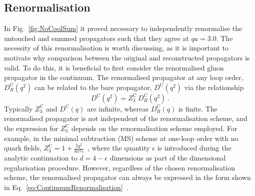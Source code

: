 \subsection{Renormalisation}\label{sec:Renormalisation}

In Fig.~\ref{fig:NoCoolSum} it proved necessary to independently renormalise the untouched and summed propagators such that they agree at $qa=3.0$. The necessity of this renormalisation is worth discussing, as it is important to motivate why comparison between the original and reconstructed propagators is valid. To do this, it is beneficial to first consider the renormalised gluon propagator in the continuum. The renormalised propagator at any loop order, $D_R^\text{C}(q^2)$ can be related to the bare propagator, $D^\text{C}(q^2)$ via the relationship
%
\begin{equation}
D^\text{C}(q^2) = Z^\text{C}_3 \, D_R^\text{C}(q^2)\, .
\label{eq:ContinuumRenormalisation}
\end{equation}
%
Typically $Z^\text{C}_3$ and $D^\text{C}(q)$ are infinite, whereas $D_R^\text{C}(q)$ is finite. The renormalised propagator is not independent of the renormalisation scheme, and the expression for $Z^\text{C}_3$ depends on the renormalisation scheme employed. For example, in the minimal subtraction (MS) scheme at one-loop order with no quark fields, $Z_3^\text{C}=1+\frac{5g^2}{8\pi^2\epsilon}$~\cite{ryder1996quantum}, where the quantity $\epsilon$ is introduced during the analytic continuation to $d = 4-\epsilon$ dimensions as part of the dimensional regularisation procedure. However, regardless of the chosen renormalisation scheme, the renormalised propagator can always be expressed in the form shown in Eq.~\ref{eq:ContinuumRenormalisation}~\cite{vanRitbergen:1997va}.\\

